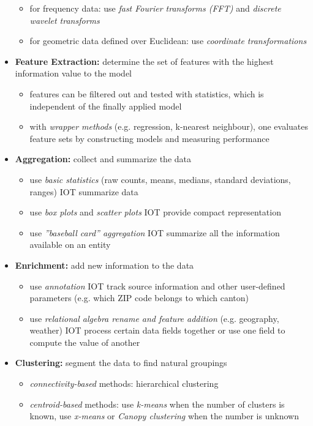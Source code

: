 \documentclass[a4paper, landscape, 6pt, fleqn]{scrartcl}
\renewcommand{\emph}[1]{\textbf{#1}}
\begin{document}
\begin{multicols*}{4}
\begin{itemize}
\begin{itemize}
\item for frequency data: use \textit{fast Fourier transforms (FFT)} and \textit{discrete wavelet transforms}
\item for geometric data defined over Euclidean: use \textit{coordinate transformations}
\end{itemize}
\item \emph{Feature Extraction:} determine the set of features with the highest information value to the model
\begin{itemize}
\item features can be filtered out and tested with statistics, which is independent of the finally applied model
\item with \textit{wrapper methods} (e.g. regression, k-nearest neighbour), one evaluates feature sets by constructing models and measuring performance
\end{itemize}
\item \emph{Aggregation:} collect and summarize the data
\begin{itemize}
\item use \textit{basic statistics} (raw counts, means, medians, standard deviations, ranges) IOT summarize data
\item use \textit{box plots} and \textit{scatter plots} IOT provide compact representation
\item use \textit{''baseball card'' aggregation} IOT summarize all the information available on an entity
\end{itemize}
\item \emph{Enrichment:} add new information to the data
\begin{itemize}
\item use \textit{annotation} IOT track source information and other user-defined parameters (e.g. which ZIP code belongs to which canton)
\item use \textit{relational algebra rename and feature addition} (e.g. geography, weather) IOT process certain data fields together or use one field to compute the value of another
\end{itemize}
\item \emph{Clustering:} segment the data to find natural groupings
\begin{itemize}
\item \textit{connectivity-based} methods: hierarchical clustering
\item \textit{centroid-based} methods: use \textit{k-means} when the number of clusters is known, use \textit{x-means} or \textit{Canopy clustering} when the number is unknown

\end{itemize}
\end{itemize}
\end{multicols*}
\end{document}
